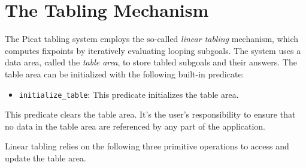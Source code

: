 \section{The Tabling Mechanism}
The Picat tabling system employs the so-called \emph{linear tabling} mechanism, which computes fixpoints by iteratively evaluating looping subgoals. The system uses a data area, called the \emph{table area}, to store tabled subgoals and their answers. The table area can be initialized with the following built-in predicate:

\begin{itemize}
\item \texttt{initialize\_table}: This predicate initializes the table area.   
\end{itemize}
This predicate clears the table area. It's the user's responsibility to ensure that no data in the table area are referenced by any part of the application.

Linear tabling relies on the following three primitive operations to access and update the table area.

